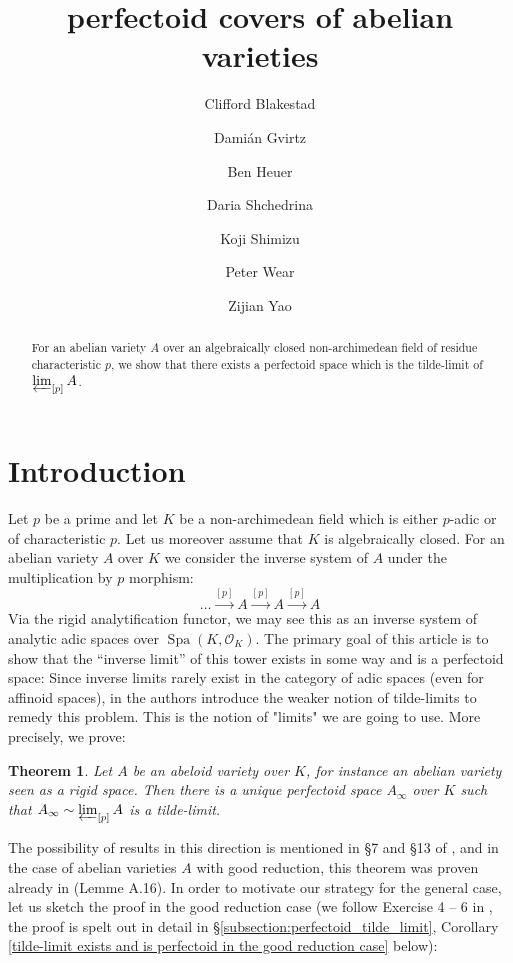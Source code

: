 \documentclass[10pt,oneside]{amsart}
\title[perfectoid covers of abelian varieties]{perfectoid  covers of abelian varieties}
\author{
	Clifford Blakestad \and
	Dami\'an Gvirtz \and
	Ben Heuer \and 
	Daria Shchedrina \and
	Koji Shimizu \and 
	Peter Wear \and
	Zijian Yao}
\newtheorem{mainthm}{Theorem}
\theoremstyle{definition}
\begin{document}
	
	\maketitle
	
	\begin{abstract}
For an abelian variety $A$ over an algebraically closed non-archimedean field of residue characteristic $p$, we show that there exists a perfectoid space which is the tilde-limit of $\varprojlim_{[p]}A$.
	\end{abstract}
	

	
	\section{Introduction} 

Let $p$ be a prime and let $K$ be a non-archimedean field which is either $p$-adic or of characteristic $p$. 
Let us moreover assume that $K$ is algebraically closed. 
For an abelian variety $A$ over $K$ we consider the inverse system of $A$ under the multiplication by $p$ morphism:
\[\dots\xrightarrow{[p]}A\xrightarrow{[p]}A\xrightarrow{[p]}A\]
Via the rigid analytification functor, we may see this as an inverse system of analytic adic spaces over $\operatorname{Spa}(K,\mathcal O_K)$.
The primary goal of this article is to show that the ``inverse limit'' of this tower exists in some way and is a perfectoid space: Since inverse limits rarely exist in the category of adic spaces (even for affinoid spaces), in \cite{SW} the authors introduce the weaker notion of tilde-limits to remedy this problem. This is the notion of "limits" we are going to use. More precisely, we prove:

 


\begin{mainthm} \label{thm:main_thm_intro}
	Let $A$ be an abeloid variety over $K$, for instance an abelian variety seen as a rigid space. Then there is a unique perfectoid space $A_\infty$ over $K$ such that
	$A_\infty \sim \varprojlim_{[p]} A$ is a tilde-limit.
\end{mainthm}

The possibility of results in this direction is mentioned in \S 7 and \S 13 of \cite{scholzeICMproceedings}, and in the case of abelian varieties $A$ with good reduction, this theorem was proven already in \cite{Pilloni-Stroh} (Lemme A.16).  In order to motivate our strategy for the general case, let us sketch the proof in the good reduction case (we follow Exercise 4 -- 6 in \cite{Bhatt}, the proof is spelt out in detail in \S \ref{subsection:perfectoid_tilde_limit}, Corollary \ref{tilde-limit exists and is perfectoid in the good reduction case} below):
\end{document}
